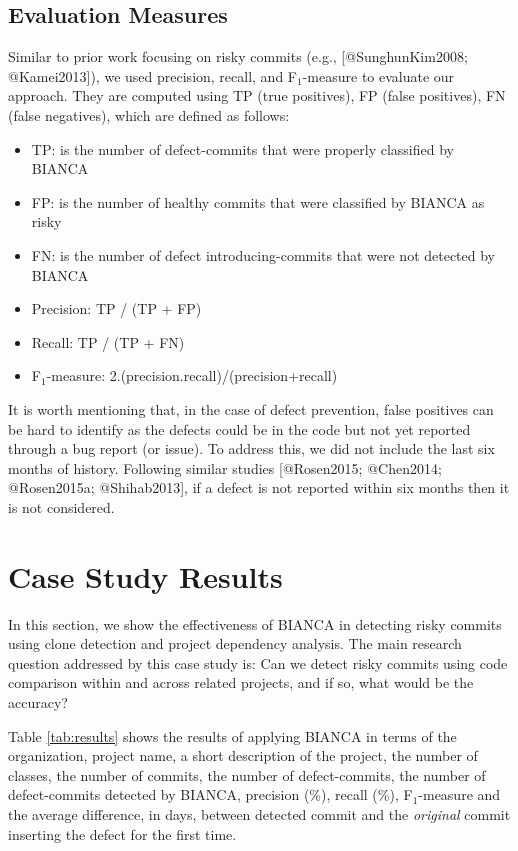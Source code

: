 \subsection{Evaluation Measures}\label{evaluation-measures}

Similar to prior work focusing on risky commits (e.g.,
{[}@SunghunKim2008; @Kamei2013{]}), we used precision, recall, and
F\(_1\)-measure to evaluate our approach. They are computed using TP
(true positives), FP (false positives), FN (false negatives), which are
defined as follows:

\begin{itemize}
\tightlist
\item
  TP: is the number of defect-commits that were properly classified by
  BIANCA
\item
  FP: is the number of healthy commits that were classified by BIANCA as
  risky
\item
  FN: is the number of defect introducing-commits that were not detected
  by BIANCA
\item
  Precision: TP / (TP + FP)
\item
  Recall: TP / (TP + FN)
\item
  F\(_1\)-measure: 2.(precision.recall)/(precision+recall)
\end{itemize}

It is worth mentioning that, in the case of defect prevention, false
positives can be hard to identify as the defects could be in the code
but not yet reported through a bug report (or issue). To address this,
we did not include the last six months of history. Following similar
studies {[}@Rosen2015; @Chen2014; @Rosen2015a; @Shihab2013{]}, if a
defect is not reported within six months then it is not considered.

\section{Case Study Results}\label{sec:result}

In this section, we show the effectiveness of BIANCA in detecting risky
commits using clone detection and project dependency analysis. The main
research question addressed by this case study is: Can we detect risky
commits using code comparison within and across related projects, and if
so, what would be the accuracy?



Table \ref{tab:results} shows the results of applying BIANCA in terms of
the organization, project name, a short description of the project, the
number of classes, the number of commits, the number of defect-commits,
the number of defect-commits detected by BIANCA, precision (\%), recall
(\%), F\(_1\)-measure and the average difference, in days, between
detected commit and the \emph{original} commit inserting the defect for
the first time.

